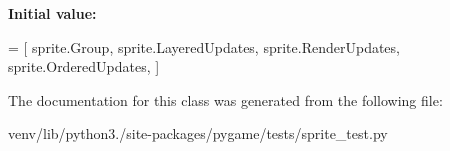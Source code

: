 {\bfseries Initial value\+:}
\begin{DoxyCode}
=  [ sprite.Group,
               sprite.LayeredUpdates,
               sprite.RenderUpdates,
               sprite.OrderedUpdates, ]
\end{DoxyCode}


The documentation for this class was generated from the following file\+:\begin{DoxyCompactItemize}
\item 
venv/lib/python3./site-\/packages/pygame/tests/sprite\+\_\+test.\+py\end{DoxyCompactItemize}
